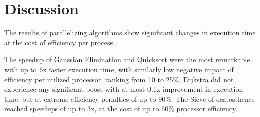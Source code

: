 \chapter{Discussion}

The results of parallelizing algorithms show significant changes in 
execution time at the cost of efficiency per process.

The speedup of Gaussian Elimination and Quicksort were the most 
remarkable, with up to 6x faster execution time,
with similarly low negative impact of efficiency per utilized processor, 
ranking from 10 to 25\%.
Dijkstra did not experience any significant boost with at most 0.1x 
improvement in execution time, but at extreme efficiency penalties 
of up to 90\%.
The Sieve of eratosthenes reached speedups of up to 3x, at the 
cost of up to 60\% processor efficiency.
